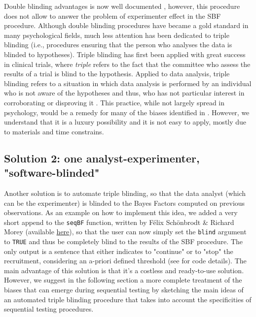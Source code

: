 \documentclass[a4paper,man,natbib,floatsintext,donotrepeattitle]{apa6}
\begin{document}

Double blinding advantages is now well documented \citep{schulz_blinding_2002}, however, this procedure does not allow to answer the problem of experimenter effect in the SBF procedure. Although double blinding procedures have became a gold standard in many psychological fields, much less attention has been dedicated to triple blinding (i.e., procedures ensuring that the person who analyses the data is blinded to hypotheses). Triple blinding has first been applied with great success in clinical trials, where \textit{triple} refers to the fact that the committee who assess the results of a trial is blind to the hypothesis. Applied to data analysis, triple blinding refers to a situation in which data analysis is performed by an individual who is not aware of the hypotheses and thus, who has not particular interest in corroborating or disproving it \citep{miller_blind_2011}. This practice, while not largely spread in psychology, would be a remedy for many of the biases identified in \cite{wicherts_degrees_2016}. However, we understand that it is a luxury possibility and it is not easy to apply, mostly due to materials and time constrains.

\subsection{Solution 2: one analyst-experimenter, "software-blinded"}

Another solution is to automate triple blinding, so that the data analyst (which can be the experimenter) is blinded to the Bayes Factors computed on previous observations. As an example on how to implement this idea, we added a very short append to the \texttt{seqBF} function, written by Félix Schönbrodt \& Richard Morey (available \href{https://raw.githubusercontent.com/richarddmorey/BayesFactorExtras/master/BayesFactorExtras/R/seqBF.R}{here}), so that the user can now simply set the \texttt{blind} argument to \texttt{TRUE} and thus be completely blind to the results of the SBF procedure. The only output is a sentence that either indicates to "continue" or to "stop" the recruitment, considering an a-priori defined threshold (see  for code details). The main advantage of this solution is that it's a costless and ready-to-use solution. However, we suggest in the following section a more complete treatment of the biases that can emerge during sequential testing by sketching the main ideas of an automated triple blinding procedure that takes into account the specificities of sequential testing procedures.
\end{document}
